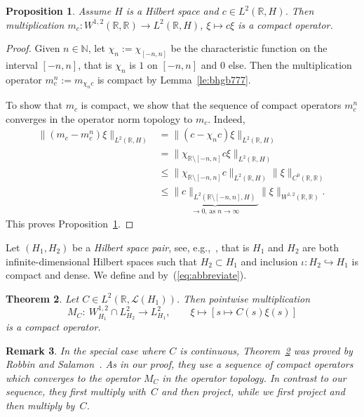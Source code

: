 \documentclass[pdftex]{sigma}
\numberwithin{equation}{section}
\newtheorem{Theorem}{Theorem}[section]
\newtheorem{Proposition}[Theorem]{Proposition}
\newtheorem{Remark}[Theorem]{Remark}
\newcommand{\N}{{\mathbb{N}}}
\newcommand{\R}{{\mathbb{R}}}
\newcommand{\Ll}{{\mathcal{L}}} %
\newcommand{\norm}{{\rm norm}}
\def\norm#1{\mathopen\|#1\mathclose\|}
\newcommand{\INTO}{\hookrightarrow} %
\newcommand{\1}{{{\mathchoice {\rm 1\mskip-4mu l} {\rm 1\mskip-4mu l}
{\rm 1\mskip-4.5mu l} {\rm 1\mskip-5mu l}}}}
\begin{document}
\begin{Proposition}\label{prop:bhgb777}
Assume $H$ is a Hilbert space and $c\in L^2(\R,H)$.
Then multiplication $m_c\colon W^{1,2}(\R,\R)\to L^2(\R,H)$,
$\xi\mapsto c\xi$ is a compact operator.
\end{Proposition}

\begin{proof}
Given $n\in\N$, let $\chi_n:=\chi_{[-n,n]}$ be the characteristic
function on the interval $[-n,n]$, that is $\chi_n$ is $1$ on $[-n,n]$
and $0$ else. Then the multiplication operator $m^n_c:=m_{\chi_n c}$
is compact by Lemma~\ref{le:bhgb777}.

To show that $m_c$ is compact, we show that the sequence of compact
operators $m^n_c$ converges in the operator norm topology to $m_c$.
Indeed,
\begin{equation*}
\begin{split}
 \norm{(m_c-m^n_c)\xi}_{L^2(\R,H)}
 &=\norm{(c-\chi_n c)\xi}_{L^2(\R,H)}\\
 &=\bigl\|\chi_{\R\setminus [-n,n]} c\xi\bigr\|_{L^2(\R,H)}\\
 &\le \bigl\|\chi_{\R\setminus [-n,n]} c\bigr\|_{L^2(\R,H)}
 \norm{\xi}_{C^0(\R,\R)}\\
 &\le \underbrace{\norm{c}_{L^2(\R\setminus[-n,n],H)}}
 _{\text{$\to 0$, as $n\to\infty$}}
 \norm{\xi}_{W^{1,2}(\R,\R)} .
\end{split}
\end{equation*}
This proves Proposition~\ref{prop:bhgb777}.
\end{proof}

Let $(H_1,H_2)$ be a \textit{Hilbert space pair},
see, e.g.,~\cite{Frauenfelder:2024c},
that is $H_1$ and $H_2$ are both infinite-dimensional
Hilbert spaces such that $H_2\subset H_1$ and inclusion
$\iota\colon H_2\INTO H_1$ is compact and dense.
We define  and  by~(\ref{eq:abbreviate}).

\begin{Theorem}\label{thm:perturbation}
Let $C\in L^2(\R,\Ll(H_1))$.
Then pointwise multiplication
\[
 M_C\colon\
 W^{1,2}_{H_1}\cap L^2_{H_2}\to L^2_{H_1}
 ,\qquad \xi\mapsto [s\mapsto C(s)\xi(s) ]
\]
is a compact operator.
\end{Theorem}

\begin{Remark}
In the special case where $C$ is continuous,
Theorem~\ref{thm:perturbation}
was proved by Robbin and Salamon~\cite[Lemma~3.18]{robbin:1995a}.
As in our proof, they
use a sequence of compact operators which converges
to the operator $M_C$ in the operator topology.
In contrast to our sequence, they first multiply with~$C$ and
then project, while we first project and then multiply by~$C$.
\end{Remark}
\end{document}
